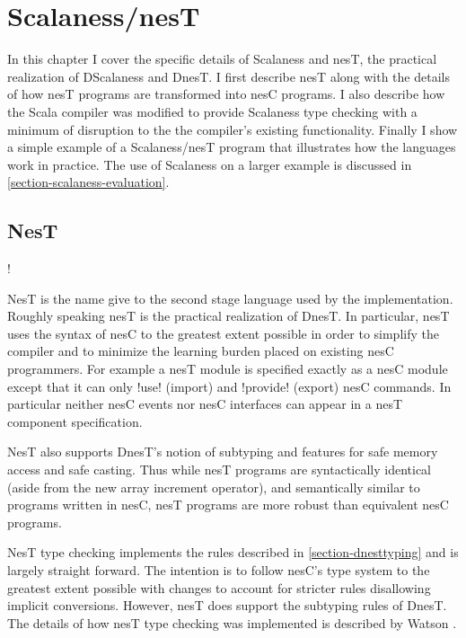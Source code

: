 \chapter{Scalaness/nesT}
\label{chapter-scalaness-nest}

In this chapter I cover the specific details of Scalaness and nesT, the practical realization of
DScalaness and DnesT. I first describe nesT along with the details of how nesT programs are
transformed into nesC programs. I also describe how the Scala compiler was modified to provide
Scalaness type checking with a minimum of disruption to the the compiler's existing
functionality. Finally I show a simple example of a Scalaness/nesT program that illustrates how
the languages work in practice. The use of Scalaness on a larger example is discussed in
\autoref{section-scalaness-evaluation}.

\section{NesT}
\label{section-nest-implementation}

\lstset{language=nesC}
\lstMakeShortInline!

NesT is the name give to the second stage language used by the implementation. Roughly speaking
nesT is the practical realization of DnesT. In particular, nesT uses the syntax of nesC to the
greatest extent possible in order to simplify the compiler and to minimize the learning burden
placed on existing nesC programmers. For example a nesT module is specified exactly as a nesC
module except that it can only !use! (import) and !provide! (export) nesC commands. In
particular neither nesC events nor nesC interfaces can appear in a nesT component specification.

NesT also supports DnesT's notion of subtyping and features for safe memory access and safe
casting. Thus while nesT programs are syntactically identical (aside from the new array
increment operator), and semantically similar to programs written in nesC, nesT programs are
more robust than equivalent nesC programs.

NesT type checking implements the rules described in \autoref{section-dnesttyping} and is
largely straight forward. The intention is to follow nesC's type system to the greatest extent
possible with changes to account for stricter rules disallowing implicit conversions. However,
nesT does support the subtyping rules of DnesT. The details of how nesT type checking was
implemented is described by Watson \cite{watson-masters-2013}.

